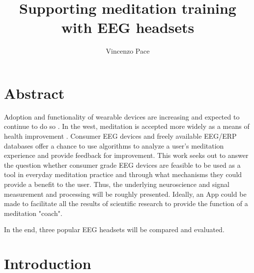 \documentclass{llncs} %
\begin{document}
\title{Supporting meditation training with EEG headsets}
\author{Vincenzo Pace}
\maketitle
\newpage
\section{Abstract}
Adoption and functionality of wearable devices are increasing and expected to continue to do so \cite{Patel}. In the west, meditation is accepted more widely as a means of health improvement \cite{Tang:et al}.
Consumer EEG devices and freely available EEG/ERP databases \cite{ucsd} offer a chance to use algorithms to analyze a user's meditation experience and provide feedback for improvement.
This work seeks out to answer the question whether consumer grade EEG devices are feasible to be used as a tool in everyday meditation practice and through what mechanisms they could provide a benefit to the user. Thus, the underlying neuroscience and signal measurement and processing will be roughly presented. Ideally, an App could be made to facilitate all the results of scientific research to provide the function of a meditation "coach". 
\medskip

In the end, three popular EEG headsets will be compared and evaluated.
\section{Introduction}
\end{document}
